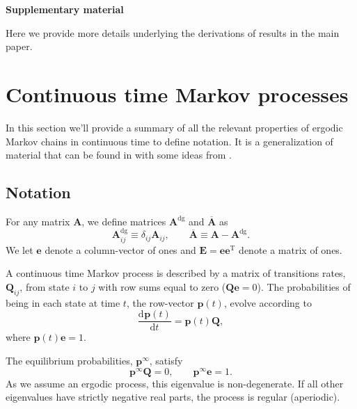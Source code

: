 \documentclass[9pt,twocolumn,twoside,lineno]{pnas-new}
\newcommand{\diff}[3][]{\frac{\mathrm{d}^{#1} #2}{\mathrm{d}{#3}^{#1}}}
\newcommand{\dg}{^\mathrm{dg}}
\newcommand{\trans}{^\mathrm{T}}
\newcommand{\onev}{\mathbf{e}}
\newcommand{\onem}{\mathbf{E}}
\newcommand{\MM}{\mathbf{Q}}
\newcommand{\prob}{\mathbf{p}}
\newcommand{\eq}{\prob^\infty}
\begin{document}
\begin{strip}
%
\appendix
\begin{center}
  \textbf{\Large Supplementary material}
\end{center}
%

Here we provide more details underlying the derivations of results in the main paper.

\section{Continuous time Markov processes}\label{sec:ContMarkov}

In this section we'll provide a summary of all the relevant properties of ergodic Markov chains in continuous time to define notation.
It is a generalization of material that can be found in \cite{kemeny1960finite} with some ideas from \cite{hunter2000survey}.


\subsection{Notation}\label{sec:not}

For any matrix $\mathbf{A}$, we define matrices $\mathbf{A}\dg$ and $\overline{\mathbf{A}}$ as
%
\begin{equation}\label{eq:dgdef}
  \mathbf{A}\dg_{ij} \equiv \delta_{ij}\mathbf{A}_{ij},
  \qquad
  \overline{\mathbf{A}} \equiv \mathbf{A}-\mathbf{A}\dg.
\end{equation}
%
We let $\onev$ denote a column-vector of ones and $\onem=\onev\onev\trans$ denote a matrix of ones.


A continuous time Markov process is described by a matrix of transitions rates, $\MM_{ij}$, from state $i$ to $j$ with row sums equal to zero ($\MM\onev=0$).
The probabilities of being in each state at time $t$, the row-vector $\mathbf{p}(t)$, evolve according to
%
\begin{equation}\label{eq:rowsum}
  \diff{\mathbf{p}(t)}{t} = \mathbf{p}(t) \MM,
\end{equation}
%
where $\mathbf{p}(t)\onev=1$.

The equilibrium probabilities, $\eq$, satisfy
%
\begin{equation}\label{eq:equilibrium}
  \eq\MM=0,
  \qquad
  \eq\onev=1.
\end{equation}
%
As we assume an ergodic process, this eigenvalue is non-degenerate.
If all other eigenvalues have strictly negative real parts, the process is regular (aperiodic).


\end{strip}
\end{document}
